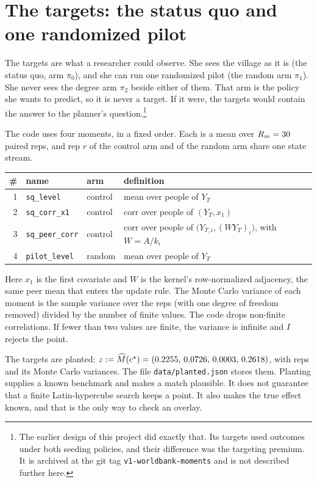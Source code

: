 \documentclass[11pt]{article}
\begin{document}
\section{The targets: the status quo and one randomized pilot}
\label{sec:targets}

The targets are what a researcher could observe. She sees the village as
it is (the status quo, arm $\pi_0$), and she can run one randomized
pilot (the random arm $\pi_1$). She never sees the degree arm $\pi_2$
beside either of them. That arm is the policy she wants to predict, so
it is never a target. If it were, the targets would contain the answer
to the planner's question.\footnote{The earlier design of this project
did exactly that. Its targets used outcomes under both seeding
policies, and their difference was the targeting premium. It is
archived at the git tag \texttt{v1-worldbank-moments} and is not
described further here.}

The code uses four moments, in a fixed order. Each is a mean over
$R_m=30$ paired reps, and rep $r$ of the control arm and of
the random arm share one state stream.
\begin{center}
\small
\begin{tabular}{@{}rllp{58mm}@{}}
\toprule
\# & name & arm & definition \\
\midrule
1 & \texttt{sq\_level} & control & mean over people of $Y_T$ \\
2 & \texttt{sq\_corr\_x1} & control & corr over people of $(Y_T,x_1)$ \\
3 & \texttt{sq\_peer\_corr} & control & corr over people of $\bigl(Y_{T,i},(WY_T)_i\bigr)$, with $W=A/k_i$ \\
4 & \texttt{pilot\_level} & random & mean over people of $Y_T$ \\
\bottomrule
\end{tabular}
\end{center}
Here $x_1$ is the first covariate and $W$ is the kernel's row-normalized
adjacency, the same peer mean that enters the update rule. The Monte
Carlo variance of each moment is the sample variance over the reps
(with one degree of freedom removed) divided by the number of finite
values. The code drops non-finite correlations. If fewer than two
values are finite, the variance is infinite and $I$ rejects the point.

The targets are planted: $z:=\widehat M(c^\star)=(0.2255,\,0.0726,\,0.0003,\,0.2618)$, with \RepsZ{}
reps and its Monte Carlo variances. The file \texttt{data/planted.json}
stores them. Planting supplies a known benchmark and makes a match
plausible. It does not guarantee that a finite Latin-hypercube search
keeps a point. It also makes the true effect known, and that is the only
way to check an overlay.
\end{document}

